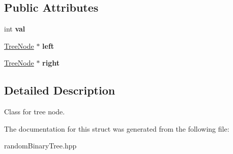 \subsection*{Public Attributes}
\begin{DoxyCompactItemize}
\item 
\mbox{\label{structTreeNode_a345b64c9d6ca399a45b516a1c7afd0eb}} 
int {\bfseries val}
\item 
\mbox{\label{structTreeNode_a5335e7d975822e87088ec2afdefb1736}} 
\hyperlink{structTreeNode}{Tree\+Node} $\ast$ {\bfseries left}
\item 
\mbox{\label{structTreeNode_a71b4faa364404d671943562b352b1b74}} 
\hyperlink{structTreeNode}{Tree\+Node} $\ast$ {\bfseries right}
\end{DoxyCompactItemize}


\subsection{Detailed Description}
Class for tree node. 

The documentation for this struct was generated from the following file\+:\begin{DoxyCompactItemize}
\item 
random\+Binary\+Tree.\+hpp\end{DoxyCompactItemize}
